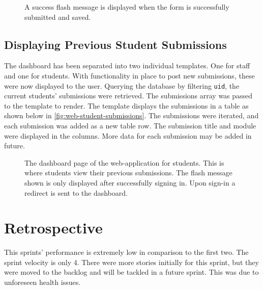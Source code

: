 \begin{figure}[H]
  \centering
  \caption[Web New Submission Success]{A success flash message is displayed when the form is successfully submitted and saved.}
  \label{fig:web-new-submission-success}
\end{figure}

\subsection{Displaying Previous Student Submissions}
The dashboard has been separated into two individual templates. One for staff and one for students. With functionality in place to post new submissions, these were now displayed to the user. Querying the database by filtering \texttt{uid}, the current students' submissions were retrieved. The submissions array was passed to the template to render. The template displays the submissions in a table as shown below in \autoref{fig:web-student-submissions}. The submissions were iterated, and each submission was added as a new table row. The submission title and module were displayed in the columns. More data for each submission may be added in future.

\begin{figure}[H]
  \centering
  \caption[Web New Submission Page]{The dashboard page of the web-application for students. This is where students view their previous submissions. The flash message shown is only displayed after successfully signing in. Upon sign-in a redirect is sent to the dashboard.}
  \label{fig:web-student-submissions}
\end{figure}

\section{Retrospective}
This sprints' performance is extremely low in comparison to the first two. The sprint velocity is only 4. There were more stories initially for this sprint, but they were moved to the backlog and will be tackled in a future sprint. This was due to unforeseen health issues.
